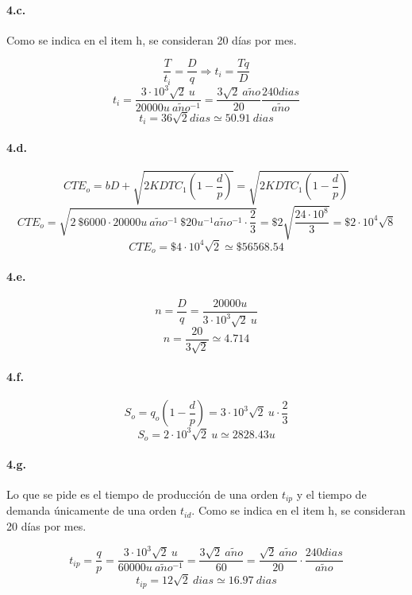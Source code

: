 \documentclass[a4paper,10pt]{article}
\def \anio {a\tilde{n}o}
\begin{document}
    \paragraph{4.c.}
        Como se indica en el item h, se consideran 20 días por mes.
        
        $$ \frac{T}{t_i} = \frac{D}{q} \Rightarrow t_i = \frac{Tq}{D} $$
        $$ t_i = \frac{3 \cdot 10^3 \sqrt{2}\ u}{20000u\ \anio^{-1}} = \frac{3 \sqrt{2}\ \anio}{20} \frac{240 dias}{\anio} $$
        $$ \boxed{ t_i = 36 \sqrt{2} dias \simeq 50.91\ dias } $$
    
    \paragraph{4.d.}
        $$ CTE_o = bD + \sqrt{ 2KDTC_1 \left( 1 - \frac{d}{p} \right) } = \sqrt{ 2KDTC_1 \left( 1 - \frac{d}{p} \right) } $$
        $$ CTE_o = \sqrt{ 2\ \$6000 \cdot 20000u\ \anio^{-1}\ \$20u^{-1}\anio^{-1} \cdot \frac{2}{3} } = \$2 \sqrt{ \frac{24 \cdot 10^8}{3} } = \$2 \cdot 10^4 \sqrt{8} $$
        $$ \boxed{ CTE_o = \$4 \cdot 10^4 \sqrt{2} \simeq \$ 56568.54 } $$

    \paragraph{4.e.}
        $$ n = \frac{D}{q} = \frac{20000u}{3 \cdot 10^3 \sqrt{2}\ u} $$
        $$ \boxed{ n = \frac{20}{3 \sqrt{2}} \simeq 4.714 } $$
    
    \paragraph{4.f.}
        $$ S_o = q_o \left( 1 - \frac{d}{p} \right) = 3 \cdot 10^3 \sqrt {2}\ u \cdot \frac{2}{3} $$
        $$ \boxed{ S_o = 2 \cdot 10^3 \sqrt {2}\ u \simeq 2828.43 u } $$
    
    \paragraph{4.g.}
        Lo que se pide es el tiempo de producción de una orden $ t_{ip} $ y el tiempo de demanda únicamente de una orden $ t_{id} $. Como se indica en el item h, se consideran 20 días por mes.
        
        $$ t_{ip} = \frac{q}{p} = \frac{3 \cdot 10^3 \sqrt {2}\ u}{60000u\ \anio^{-1}} = \frac{3 \sqrt {2}\ \anio}{60} = \frac{\sqrt{2}\ \anio}{20} \cdot \frac{240dias}{\anio}$$
        $$ \boxed{ t_{ip} = 12\sqrt{2}\ dias \simeq 16.97\ dias } $$
        
\end{document}
